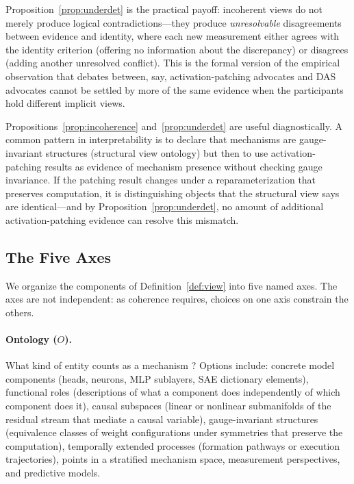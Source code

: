 \documentclass[11pt]{article}
\theoremstyle{remark}
\begin{document}
Proposition~\ref{prop:underdet} is the practical payoff: incoherent
views do not merely produce logical contradictions---they produce
\emph{unresolvable} disagreements between evidence and identity, where
each new measurement either agrees with the identity criterion (offering
no information about the discrepancy) or disagrees (adding another
unresolved conflict).  This is the formal version of the empirical
observation that debates between, say, activation-patching advocates and
DAS advocates cannot be settled by more of the same evidence when the
participants hold different implicit views.

Propositions~\ref{prop:incoherence} and~\ref{prop:underdet} are useful
diagnostically.  A common pattern in interpretability is to declare that
mechanisms are gauge-invariant structures (structural view ontology)
but then to use activation-patching results as evidence of mechanism
presence without checking gauge invariance.  If the patching result
changes under a reparameterization that preserves computation, it is
distinguishing objects that the structural view says are identical---and
by Proposition~\ref{prop:underdet}, no amount of additional
activation-patching evidence can resolve this mismatch.

\subsection{The Five Axes}\label{sec:axes}

We organize the components of Definition~\ref{def:view} into five named
axes.  The axes are not independent: as coherence requires, choices on
one axis constrain the others.

\paragraph{Ontology ($O$).}
What kind of entity counts as a mechanism \citep{quine1948}?
Options include: concrete
model components (heads, neurons, MLP sublayers, SAE dictionary
elements), functional roles (descriptions of what a component does
independently of which component does it), causal subspaces (linear or
nonlinear submanifolds of the residual stream that mediate a causal
variable), gauge-invariant structures (equivalence classes of weight
configurations under symmetries that preserve the computation),
temporally extended processes (formation pathways or execution
trajectories), points in a stratified mechanism space, measurement
perspectives, and predictive models.
\end{document}
